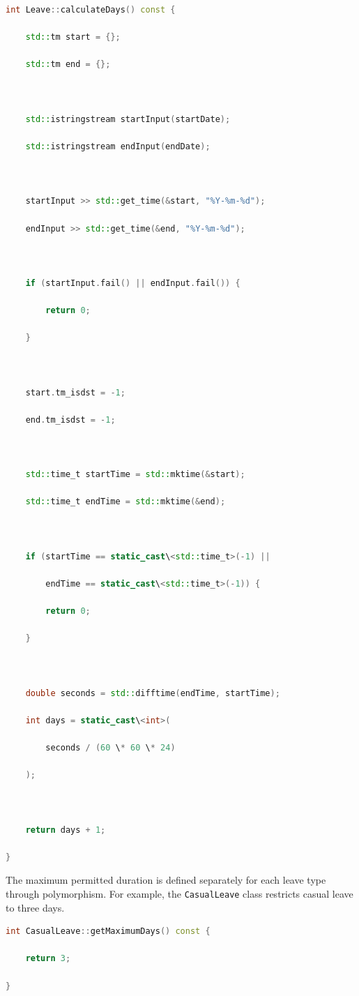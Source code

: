 \documentclass[12pt,a4paper,oneside]{book}
\begin{document}
\begin{lstlisting}[language=C++,caption={Leave duration calculation},label={code:example-4}]
int Leave::calculateDays() const {

    std::tm start = {};

    std::tm end = {};



    std::istringstream startInput(startDate);

    std::istringstream endInput(endDate);



    startInput >> std::get_time(&start, "%Y-%m-%d");

    endInput >> std::get_time(&end, "%Y-%m-%d");



    if (startInput.fail() || endInput.fail()) {

        return 0;

    }



    start.tm_isdst = -1;

    end.tm_isdst = -1;



    std::time_t startTime = std::mktime(&start);

    std::time_t endTime = std::mktime(&end);



    if (startTime == static_cast\<std::time_t>(-1) ||

        endTime == static_cast\<std::time_t>(-1)) {

        return 0;

    }



    double seconds = std::difftime(endTime, startTime);

    int days = static_cast\<int>(

        seconds / (60 \* 60 \* 24)

    );



    return days + 1;

}
\end{lstlisting}



The maximum permitted duration is defined separately for each leave type through polymorphism. For example, the \texttt{CasualLeave} class restricts casual leave to three days.



\begin{lstlisting}[language=C++,caption={Maximum permitted casual-leave duration},label={code:example-5}]
int CasualLeave::getMaximumDays() const {

    return 3;

}
\end{lstlisting}
\end{document}
